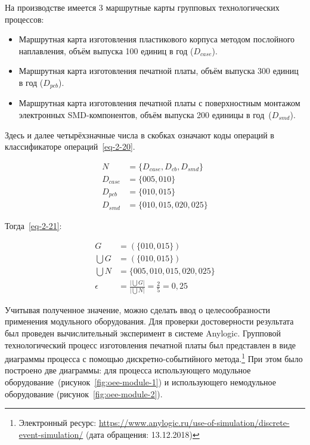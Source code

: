 На производстве имеется 3 маршрутные карты групповых технологических процессов:

\begin{itemize}
	\item Маршрутная карта изготовления пластикового корпуса методом послойного наплавления, объём выпуска 100 единиц в год ($D_{case}$).
	\item Маршрутная карта изготовления печатной платы, объём выпуска 300 единиц в год ($D_{pcb}$).
	\item Маршрутная карта изготовления печатной платы с поверхностным монтажом электронных SMD-компонентов, объём выпуска 200 единицы в год~($D_{smd}$).
\end{itemize}

Здесь и далее четырёхзначные числа в скобках означают коды операций в классификаторе операций~\cref{eq-2-20}.

\begin{equation}
\begin{split}
	N &= \{D_{case}, D_{cb}, D_{smd}\} \\
	D_{case} &= \{005, 010\} \\
	D_{pcb} &= \{010, 015\} \\
	D_{smd} &= \{010, 015, 020, 025\}
\end{split}
\label{eq-2-20}
\end{equation}

\noindent Тогда~\cref{eq-2-21}:

\begin{equation}
\begin{split}
G &= (\{010, 015\}) \\
\bigcup G &= (\{010, 015\}) \\
\bigcup N &= \{005, 010, 015, 020, 025\} \\
\epsilon &= \frac{\big|\bigcup G \big|}{\big|\bigcup N \big|} = \frac{2}{5} = 0,25
\end{split}
\label{eq-2-21}
\end{equation}

Учитывая полученное значение, можно сделать ввод о целесообразности применения модульного оборудования. Для проверки достоверности результата был проведен вычислительный эксперимент в системе Anylogic. Групповой технологический процесс изготовления печатной платы был представлен в виде диаграммы процесса с помощью дискретно-событийного метода.\footnote{Электронный ресурс: \url{https://www.anylogic.ru/use-of-simulation/discrete-event-simulation/} (дата обращения: 13.12.2018)} При этом было построено две диаграммы: для процесса использующего модульное оборудование~(рисунок~\cref{fig:oee-module-1}) и использующего немодульное оборудование (рисунок~\cref{fig:oee-module-2}).

